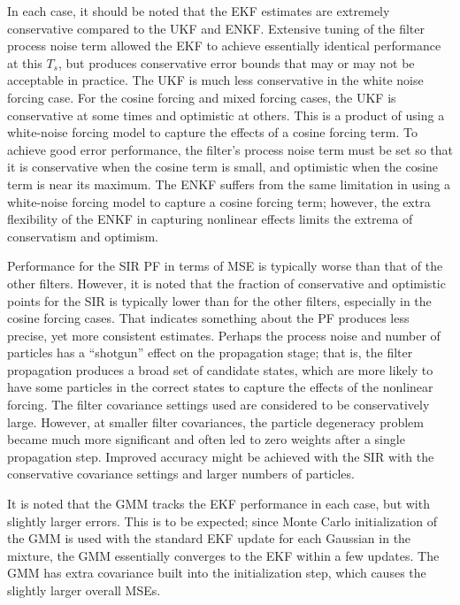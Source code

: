 \documentclass[]{article}
\begin{document}
In each case, it should be noted that the EKF estimates are extremely conservative compared to the UKF and ENKF. Extensive tuning of the filter process noise term allowed the EKF to achieve essentially identical performance at this $T_s$, but produces conservative error bounds that may or may not be acceptable in practice. The UKF is much less conservative in the white noise forcing case. For the cosine forcing and mixed forcing cases, the UKF is conservative at some times and optimistic at others. This is a product of using a white-noise forcing model to capture the effects of a cosine forcing term. To achieve good error performance, the filter's process noise term must be set so that it is conservative when the cosine term is small, and optimistic when the cosine term is near its maximum. The ENKF suffers from the same limitation in using a white-noise forcing model to capture a cosine forcing term; however, the extra flexibility of the ENKF in capturing nonlinear effects limits the extrema of conservatism and optimism.

Performance for the SIR PF in terms of MSE is typically worse than that of the other filters. However, it is noted that the fraction of conservative and optimistic points for the SIR is typically lower than for the other filters, especially in the cosine forcing cases. That indicates something about the PF produces less precise, yet more consistent estimates. Perhaps the process noise and number of particles has a ``shotgun'' effect on the propagation stage; that is, the filter propagation produces a broad set of candidate states, which are more likely to have some particles in the correct states to capture the effects of the nonlinear forcing. The filter covariance settings used are considered to be conservatively large. However, at smaller filter covariances, the particle degeneracy problem became much more significant and often led to zero weights after a single propagation step. Improved  accuracy might be achieved with the SIR with the conservative covariance settings and larger numbers of particles.

It is noted that the GMM tracks the EKF performance in each case, but with slightly larger errors. This is to be expected; since Monte Carlo initialization of the GMM is used with the standard EKF update for each Gaussian in the mixture, the GMM essentially converges to the EKF within a few updates. The GMM has extra covariance built into the initialization step, which causes the slightly larger overall MSEs.
\end{document}
